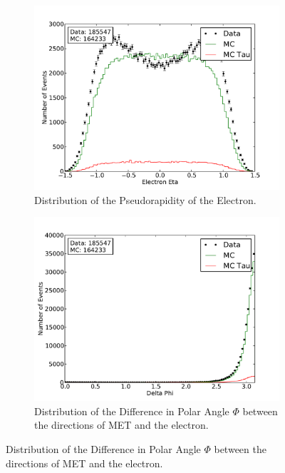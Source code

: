 \documentclass[
	paper=A4,
	parskip=full,
	chapterprefix=true,
	11pt,
	headings=normal,
	bibliography=totoc,
	listof=totoc,
	titlepage=on,
]{scrreprt}
\begin{document}
\begin{figure}%
	\centering
	\begin{subfigure}{0.45\textwidth}
		\includegraphics{./nocuts/eta_el}
		\caption{Distribution of the Pseudorapidity of the Electron.}
	\end{subfigure}
	\begin{subfigure}{0.45\textwidth}
		\includegraphics{./nocuts/delta_phi}
		\caption{Distribution of the Difference in Polar Angle $\Phi$ between the directions of MET and the electron.}
	\end{subfigure}
	\label{no_cuts_etaphi}
\end{figure}
\end{document}

